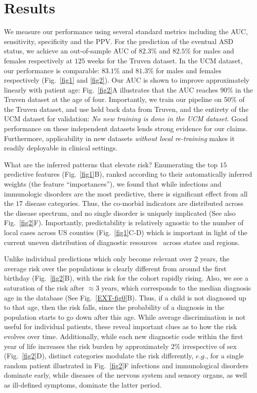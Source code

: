 \documentclass[onecolumn,10pt]{IEEEtran}
\begin{document}

\section*{Results}


We measure our performance using several standard metrics including the AUC, sensitivity, specificity and the PPV. For the prediction of the eventual ASD  status, we achieve an out-of-sample AUC of $82.3\%$ and  $82.5\%$ for males and females respectively at $125$ weeks for the Truven dataset. In the UCM dataset, our performance is comparable: $83.1\%$ and $81.3\%$ for males and females respectively (Fig.~\ref{fig1} and \ref{fig2}).  Our AUC is shown to improve approximately  linearly  with patient age: Fig.~\ref{fig2}A illustrates that the  AUC  reaches 90\%  in the Truven dataset at the age of four. Importantly, we train  our  pipeline on 50\% of the Truven dataset, and use held back data from Truven, and the entirety of the UCM dataset for validation: \textit{No new training is done in the UCM dataset.} Good  performance on these independent datasets lends strong evidence for our claims. Furthermore, applicability in new datasets \textit{without local re-training} makes it readily  deployable in clinical settings.

What are the inferred patterns that  elevate risk?  Enumerating the top $15$ predictive features (Fig.~\ref{fig1}B), ranked  according to their automatically inferred weights  (the feature ``importances''), we found that while infections and immunologic disorders are the most predictive, there is significant effect from all the $17$ disease categories. Thus, the  co-morbid indicators are  distributed across the disease spectrum, and no single  disorder is uniquely implicated (See also Fig.~\ref{fig2}F). Importantly, predictability is relatively agnostic to the number of local cases across US counties (Fig.~\ref{fig1}C-D) which is important in light of the current uneven distribution of  diagnostic resources~\cite{gordon2016whittling,althouse2006pediatric} across states and regions.

Unlike individual predictions which only become relevant over 2 years, the average risk over the populations is clearly different  from around the  first birthday (Fig.~\ref{fig2}B), with the risk for the  \treatment cohort rapidly rising. Also, we see a saturation of the risk after $\approx 3$ years, which corresponds to the median diagnosis age in the database (See Fig.~\ref{EXT-fig0}B). Thus, if a child is not diagnosed up to that age, then the  risk  falls, since the probability of a diagnosis in the population starts to go down after this age. While average discrimination is not useful for individual patients, these reveal important clues as to how the  risk evolves over time. Additionally, while  each  new diagnostic code within the first year of life  increases the risk burden by approximately $2\%$ irrespective of sex (Fig.~\ref{fig2}D), distinct  categories modulate the risk differently, $e.g.$, for a single random patient  illustrated in Fig.~\ref{fig2}F infections and immunological disorders dominate early, while  diseases of the nervous system and sensory organs, as well as ill-defined symptoms,  dominate the latter period.
\end{document}
